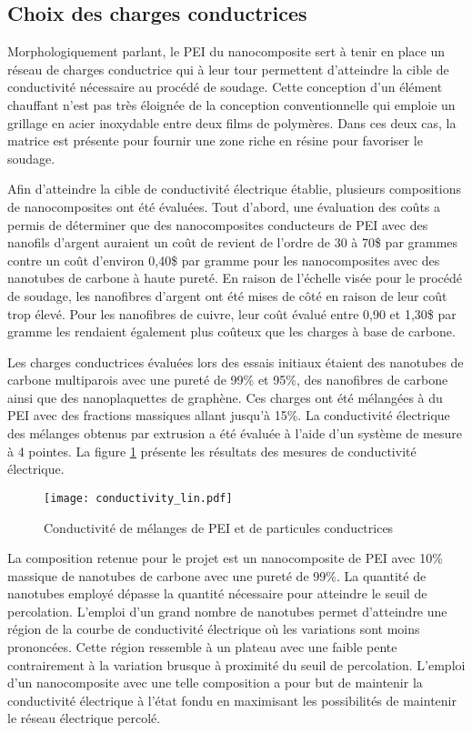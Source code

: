 \subsection{Choix des charges conductrices}

Morphologiquement parlant, le PEI du nanocomposite sert à tenir en place un réseau de charges conductrice qui à leur tour permettent d'atteindre la cible de conductivité nécessaire au procédé de soudage. 
Cette conception d'un élément chauffant n'est pas très éloignée de la conception conventionnelle qui emploie un grillage en acier inoxydable entre deux films de polymères. 
Dans ces deux cas, la matrice est présente pour fournir une zone riche en résine pour favoriser le soudage. 

Afin d'atteindre la cible de conductivité électrique établie, plusieurs compositions de nanocomposites ont été évaluées. 
Tout d'abord, une évaluation des coûts a permis de déterminer que des nanocomposites conducteurs de PEI avec des nanofils d'argent auraient un coût de revient de l'ordre de 30 à 70\$ par grammes contre un coût d'environ 0,40\$ par gramme pour les nanocomposites avec des nanotubes de carbone à haute pureté. 
En raison de l'échelle visée pour le procédé de soudage, les nanofibres d'argent ont été mises de côté en raison de leur coût trop élevé. 
Pour les nanofibres de cuivre, leur coût évalué entre 0,90 et 1,30\$ par gramme les rendaient également plus coûteux que les charges à base de carbone. 

Les charges conductrices évaluées lors des essais initiaux étaient des nanotubes de carbone multiparois avec une pureté de 99\% et 95\%, des nanofibres de carbone ainsi que des nanoplaquettes de graphène. 
Ces charges ont été mélangées à du PEI avec des fractions massiques allant jusqu'à 15\%.
La conductivité électrique des mélanges obtenus par extrusion a été évaluée à l'aide d'un système de mesure à 4 pointes. 
La figure \ref{fig:conductivite_lin} présente les résultats des mesures de conductivité électrique. 

\begin{figure}[h]
	\centering
	\texttt{[image: conductivity\_lin.pdf]}
	\caption{Conductivité de mélanges de PEI et de particules conductrices}
	\label{fig:conductivite_lin}
\end{figure}
 
La composition retenue pour le projet est un nanocomposite de PEI avec 10\% massique de nanotubes de carbone avec une pureté de 99\%. 
La quantité de nanotubes employé dépasse la quantité nécessaire pour atteindre le seuil de percolation. 
L'emploi d'un grand nombre de nanotubes permet d'atteindre une région de la courbe de conductivité électrique où les variations sont moins prononcées. 
Cette région ressemble à un plateau avec une faible pente contrairement à la variation brusque à proximité du seuil de percolation. 
L'emploi d'un nanocomposite avec une telle composition a pour but de maintenir la conductivité électrique à l'état fondu en maximisant les possibilités de maintenir le réseau électrique percolé. 
 
